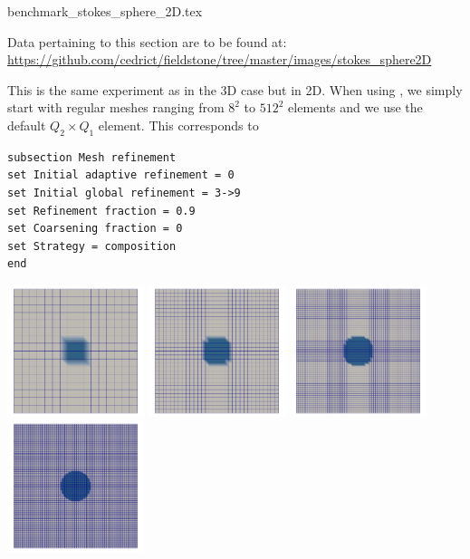\begin{flushright} {\tiny {\color{gray} benchmark\_stokes\_sphere\_2D.tex}} \end{flushright}

\vspace{1cm}
\begin{flushright}
Data pertaining to this section are to be found at:
\url{https://github.com/cedrict/fieldstone/tree/master/images/stokes_sphere2D}
\end{flushright}
\vspace{1cm}

This is the same experiment as in the 3D case but in 2D. 
When using \aspect, we simply start with regular meshes ranging from $8^2$ to $512^2$ elements 
and we use the default $Q_2\times Q_1$ element.  
This corresponds to 
\begin{verbatim}
subsection Mesh refinement
set Initial adaptive refinement = 0 
set Initial global refinement = 3->9 
set Refinement fraction = 0.9 
set Coarsening fraction = 0 
set Strategy = composition
end
\end{verbatim}

\begin{center}
\includegraphics[width=4cm]{images/stokes_sphere2D/aspect_FS_gr/C1_gr3}
\includegraphics[width=4cm]{images/stokes_sphere2D/aspect_FS_gr/C1_gr4}
\includegraphics[width=4cm]{images/stokes_sphere2D/aspect_FS_gr/C1_gr5}
\includegraphics[width=4cm]{images/stokes_sphere2D/aspect_FS_gr/C1_gr6}
\end{center}


